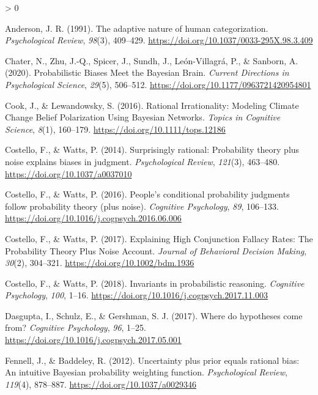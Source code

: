 \documentclass[
  english,
  man,floatsintext]{apa6}
\newlength{\cslhangindent}
\newenvironment{CSLReferences}[2] %
 {%
  \setlength{\parindent}{0pt}
  \ifodd #1 \everypar{\setlength{\hangindent}{\cslhangindent}}\ignorespaces\fi
  \ifnum #2 > 0
  \setlength{\parskip}{#2\baselineskip}
  \fi
 }%
 {}
\begin{document}
\hypertarget{refs}{}
\begin{CSLReferences}{1}{0}
\leavevmode\hypertarget{ref-anderson1991}{}%
Anderson, J. R. (1991). The adaptive nature of human categorization. \emph{Psychological Review}, \emph{98}(3), 409--429. \url{https://doi.org/10.1037/0033-295X.98.3.409}

\leavevmode\hypertarget{ref-chater.etal2020}{}%
Chater, N., Zhu, J.-Q., Spicer, J., Sundh, J., León-Villagrá, P., \& Sanborn, A. (2020). Probabilistic {Biases Meet} the {Bayesian Brain}. \emph{Current Directions in Psychological Science}, \emph{29}(5), 506--512. \url{https://doi.org/10.1177/0963721420954801}

\leavevmode\hypertarget{ref-cook.lewandowsky2016}{}%
Cook, J., \& Lewandowsky, S. (2016). Rational {Irrationality}: {Modeling Climate Change Belief Polarization Using Bayesian Networks}. \emph{Topics in Cognitive Science}, \emph{8}(1), 160--179. \url{https://doi.org/10.1111/tops.12186}

\leavevmode\hypertarget{ref-costello.watts2014}{}%
Costello, F., \& Watts, P. (2014). Surprisingly rational: {Probability} theory plus noise explains biases in judgment. \emph{Psychological Review}, \emph{121}(3), 463--480. \url{https://doi.org/10.1037/a0037010}

\leavevmode\hypertarget{ref-costello.watts2016}{}%
Costello, F., \& Watts, P. (2016). People's conditional probability judgments follow probability theory (plus noise). \emph{Cognitive Psychology}, \emph{89}, 106--133. \url{https://doi.org/10.1016/j.cogpsych.2016.06.006}

\leavevmode\hypertarget{ref-costello.watts2017}{}%
Costello, F., \& Watts, P. (2017). Explaining {High Conjunction Fallacy Rates}: {The Probability Theory Plus Noise Account}. \emph{Journal of Behavioral Decision Making}, \emph{30}(2), 304--321. \url{https://doi.org/10.1002/bdm.1936}

\leavevmode\hypertarget{ref-costello.watts2018}{}%
Costello, F., \& Watts, P. (2018). Invariants in probabilistic reasoning. \emph{Cognitive Psychology}, \emph{100}, 1--16. \url{https://doi.org/10.1016/j.cogpsych.2017.11.003}

\leavevmode\hypertarget{ref-dasgupta.etal2017}{}%
Dasgupta, I., Schulz, E., \& Gershman, S. J. (2017). Where do hypotheses come from? \emph{Cognitive Psychology}, \emph{96}, 1--25. \url{https://doi.org/10.1016/j.cogpsych.2017.05.001}

\leavevmode\hypertarget{ref-fennell.baddeley2012}{}%
Fennell, J., \& Baddeley, R. (2012). Uncertainty plus prior equals rational bias: {An} intuitive {Bayesian} probability weighting function. \emph{Psychological Review}, \emph{119}(4), 878--887. \url{https://doi.org/10.1037/a0029346}


\end{CSLReferences}
\end{document}
